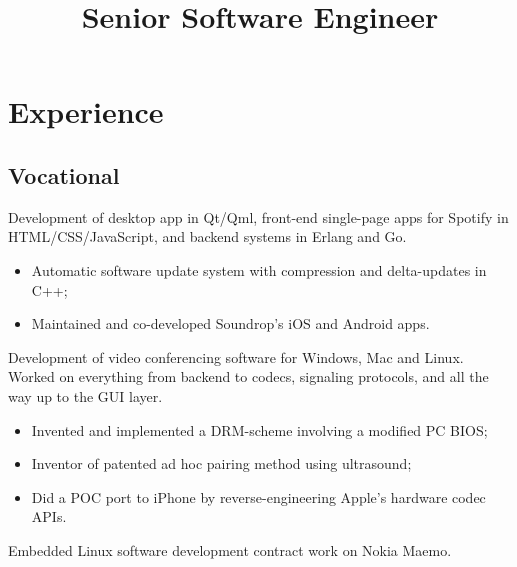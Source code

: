 \documentclass[11pt,a4paper,sans]{moderncv}
\title{Senior Software Engineer}
\begin{document}
\makecvtitle

\section{Experience}
\subsection{Vocational}
{Development of desktop app in Qt/Qml, front-end single-page apps for Spotify
in HTML/CSS/JavaScript, and backend systems in Erlang and Go.
\begin{itemize}
\item Automatic software update system with compression and delta-updates in C++;
\item Maintained and co-developed Soundrop's iOS and Android apps.
\end{itemize}}
{Development of video conferencing software for Windows, Mac and Linux.
Worked on everything from backend to codecs, signaling protocols, and all the
way up to the GUI layer.
\begin{itemize}
\item Invented and implemented a DRM-scheme involving a modified PC BIOS;
\item Inventor of patented ad hoc pairing method using ultrasound;
\item Did a POC port to iPhone by reverse-engineering Apple's hardware codec APIs.
\end{itemize}}
{Embedded Linux software development contract work on Nokia Maemo.}
\end{document}
